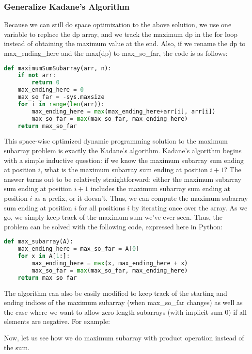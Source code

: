 \documentclass[../main.tex]{subfiles}
\begin{document}
\subsubsection{Generalize Kadane's Algorithm}
Because we can still do space optimization to the above solution, we use one variable to replace the dp array, and we track the maximum dp in the for loop instead of obtaining the maximum value at the end. Also, if we rename the dp to max\_ending\_here and the max(dp) to max\_so\_far, the code is as follows:
\begin{lstlisting}[language=Python]
def maximumSumSubarray(arr, n): 
    if not arr:
        return 0
    max_ending_here = 0
    max_so_far = -sys.maxsize
    for i in range(len(arr)):
        max_ending_here = max(max_ending_here+arr[i], arr[i])
        max_so_far = max(max_so_far, max_ending_here)
    return max_so_far
\end{lstlisting}
This space-wise optimized dynamic programming solution to the maximum subarray problem is exactly the Kadane's algorithm.  Kadane's algorithm begins with a simple inductive question: if we know the maximum subarray sum ending at position $i$, what is the maximum subarray sum ending at position $i+1$? The answer turns out to be relatively straightforward: either the maximum subarray sum ending at position $i+1$ includes the maximum subarray sum ending at position $i$ as a prefix, or it doesn't. Thus, we can compute the maximum subarray sum ending at position $i$ for all positions $i$ by iterating once over the array. As we go, we simply keep track of the maximum sum we've ever seen. Thus, the problem can be solved with the following code, expressed here in Python:
\begin{lstlisting}[language = Python]
def max_subarray(A):
    max_ending_here = max_so_far = A[0]
    for x in A[1:]:
        max_ending_here = max(x, max_ending_here + x)
        max_so_far = max(max_so_far, max_ending_here)
    return max_so_far
\end{lstlisting}

The algorithm can also be easily modified to keep track of the starting and ending indices of the maximum subarray (when max\_so\_far changes) as well as the case where we want to allow zero-length subarrays (with implicit sum 0) if all elements are negative. For example: 

Now, let us see how we do maximum subarray with product operation instead of the sum. 
\end{document}
